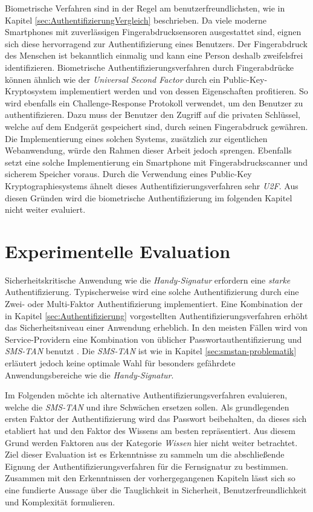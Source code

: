 \documentclass[11pt,a4paper,ngerman]{scrreprt}
\begin{document}
Biometrische Verfahren sind in der Regel am benutzerfreundlichsten, wie in Kapitel \ref{sec:AuthentifizierungVergleich} beschrieben. Da viele moderne Smartphones mit zuverlässigen Fingerabdrucksensoren ausgestattet sind, eignen sich diese hervorragend zur Authentifizierung eines Benutzers. Der Fingerabdruck des Menschen ist bekanntlich einmalig und kann eine Person deshalb zweifelsfrei identifizieren. Biometrische Authentifizierungsverfahren durch Fingerabdrücke können ähnlich wie der \textit{Universal Second Factor} durch ein Public-Key-Kryptosystem implementiert werden und von dessen Eigenschaften profitieren. So wird ebenfalls ein Challenge-Response Protokoll verwendet, um den Benutzer zu authentifizieren. Dazu muss der Benutzer den Zugriff auf die privaten Schlüssel, welche auf dem Endgerät gespeichert sind, durch seinen Fingerabdruck gewähren. Die Implementierung eines solchen Systems, zusätzlich zur eigentlichen Webanwendung, würde den Rahmen dieser Arbeit jedoch sprengen. Ebenfalls setzt eine solche Implementierung ein Smartphone mit Fingerabdruckscanner und sicherem Speicher voraus. Durch die Verwendung eines Public-Key Kryptographiesystems ähnelt dieses Authentifizierungsverfahren sehr \textit{U2F}. Aus diesen Gründen wird die biometrische Authentifizierung im folgenden Kapitel nicht weiter evaluiert.

\chapter{Experimentelle Evaluation}
Sicherheitskritische Anwendung wie die \textit{Handy-Signatur} erfordern eine \emph{starke} Authentifizierung. Typischerweise wird eine solche Authentifizierung durch eine Zwei- oder Multi-Faktor Authentifizierung implementiert. Eine Kombination der in Kapitel \ref{sec:Authentifizierung} vorgestellten Authentifizierungsverfahren erhöht das Sicherheitsniveau einer Anwendung erheblich. In den meisten Fällen wird von Service-Providern eine Kombination von üblicher Passwortauthentifizierung und \textit{SMS-TAN} benutzt \cite{fido17}. Die \textit{SMS-TAN} ist wie in Kapitel \ref{sec:smstan-problematik} erläutert jedoch keine optimale Wahl für besonders gefährdete Anwendungsbereiche wie die \textit{Handy-Signatur}.

Im Folgenden möchte ich alternative Authentifizierungsverfahren evaluieren, welche die \textit{SMS-TAN} und ihre Schwächen ersetzen sollen. Als grundlegenden ersten Faktor der Authentifizierung wird das Passwort beibehalten, da dieses sich etabliert hat und den Faktor des Wissens am besten repräsentiert. Aus diesem Grund werden Faktoren aus der Kategorie \emph{Wissen} hier nicht weiter betrachtet. Ziel dieser Evaluation ist es Erkenntnisse zu sammeln um die abschließende Eignung der Authentifizierungsverfahren für die Fernsignatur zu bestimmen. Zusammen mit den Erkenntnissen der vorhergegangenen Kapiteln lässt sich so eine fundierte Aussage über die Tauglichkeit in Sicherheit, Benutzerfreundlichkeit und Komplexität formulieren.
\end{document}

